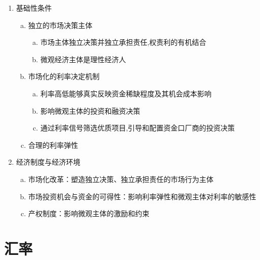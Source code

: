 \documentclass[12pt]{book}
\begin{document}
\begin{enumerate}[(1)]
    \item 基础性条件
          \begin{enumerate}[a.]
              \item 独立的市场决策主体
                    \begin{enumerate}[(a)]
                        \item 市场主体独立决策并独立承担责任,权责利的有机结合
                        \item 微观经济主体是理性经济人
                    \end{enumerate}
              \item 市场化的利率决定机制
                    \begin{enumerate}[(a)]
                        \item 利率高低能够真实反映资金稀缺程度及其机会成本影响
                        \item 影响微观主体的投资和融资决策
                        \item 通过利率信号筛选优质项目,引导和配置资金口厂商的投资决策
                    \end{enumerate}
              \item 合理的利率弹性
          \end{enumerate}
    \item 经济制度与经济环境
          \begin{enumerate}[a.]
              \item 市场化改革：塑造独立决策、独立承担责任的市场行为主体
              \item 市场投资机会与资金的可得性：影响利率弹性和微观主体对利率的敏感性
              \item 产权制度：影响微观主体的激励和约束
          \end{enumerate}
\end{enumerate}













\chapter{汇率}
\end{document}
